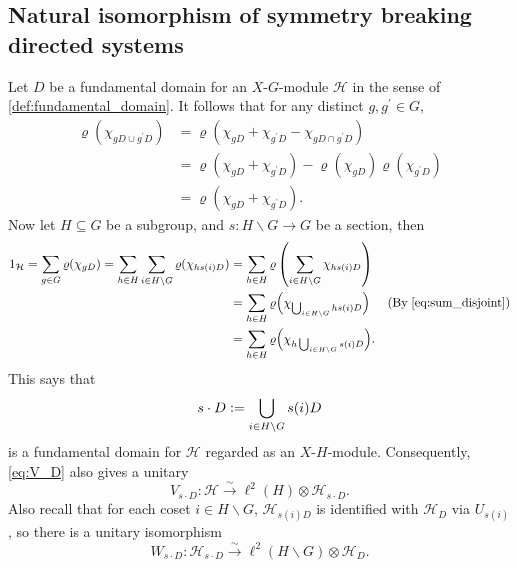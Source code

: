 \documentclass{amsart}
\numberwithin{figure}{section}
\numberwithin{equation}{section}
\numberwithin{table}{section}
\theoremstyle{plain}
\theoremstyle{definition}
\theoremstyle{remark}
\theoremstyle{nonumber}
\newcommand{\defeq}{\mathrel{\vcentcolon=}}
\begin{document}
\subsection{Natural isomorphism of symmetry breaking directed systems}
Let $D$ be a fundamental domain for an $X$-$G$-module $\mathcal{H}$ in
the sense of \cref{def:fundamental_domain}. It follows that for any distinct $g, g^\prime \in G$,
\begin{equation}\label{eq:sum_disjoint}
\begin{aligned}
\varrho(\chi_{gD\cup g^\prime D})&=\varrho\left(\chi_{gD}+\chi_{g^\prime D}-\chi_{gD\cap g^\prime D}\right)\\
&=\varrho\left(\chi_{gD}+\chi_{g^\prime D}\right)-\varrho(\chi_{gD})\varrho(\chi_{g^\prime D})\\
&=\varrho\left(\chi_{gD}+\chi_{g^\prime D}\right).
\end{aligned}
\end{equation}
Now let $H\subseteq G$ be a subgroup, 
and $s\colon H\backslash G\to G$ be a section, then
\begin{align*}
1_{\mathcal{H}} = \sum_{g\in G}\varrho(\chi_{gD})
=\sum_{h\in H}\sum_{i\in H\backslash G}\varrho(\chi_{hs(i)D})
&=\sum_{h\in H}\varrho\left(\sum_{i\in H\backslash G}\chi_{hs(i)D}\right)\\
&=\sum_{h\in H}\varrho\Big(\chi_{\bigcup_{i\in H\backslash G} hs(i)D}\Big) & ({\rm By}\;\eqref{eq:sum_disjoint})\\
&= \sum_{h\in H}\varrho\Big(\chi_{h\bigcup_{i\in H\backslash G}s(i)D}\Big).
\end{align*}
This says that
\begin{equation}\label{eq:section.act.on.fund.domain}
s\cdot D\defeq \bigcup_{i\in H\backslash G} s(i) D
\end{equation}
is a fundamental domain for $\mathcal{H}$ regarded as an $X$-$H$-module.  
Consequently, \eqref{eq:V_D} also gives a unitary
\[
V_{s\cdot D}\colon \mathcal{H}\xrightarrow{\sim} \ell^2(H)\otimes \mathcal{H}_{s\cdot D}.
\]
Also recall that for each coset $i\in H\backslash G$, $\mathcal{H}_{s(i)D}$
is identified with $\mathcal{H}_D$ via $U_{s(i)}$, so there is a
unitary isomorphism
\[
W_{s\cdot D}\colon\mathcal{H}_{s\cdot D}\xrightarrow{\sim} 
\ell^2(H\backslash G)\otimes \mathcal{H}_D.
\]
\end{document}
